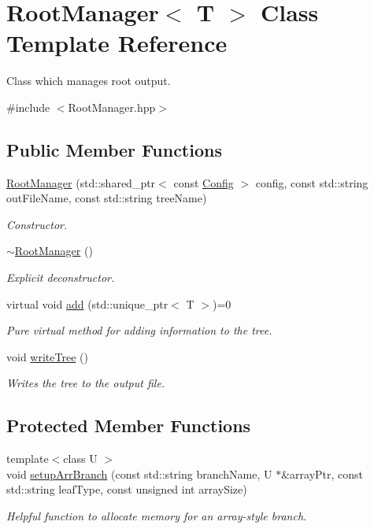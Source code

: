\hypertarget{class_root_manager}{}\section{Root\+Manager$<$ T $>$ Class Template Reference}
\label{class_root_manager}


Class which manages root output.  




{\ttfamily \#include $<$Root\+Manager.\+hpp$>$}

\subsection*{Public Member Functions}
\begin{DoxyCompactItemize}
\item 
\hyperlink{class_root_manager_a90ff78b3122c0b3fad62bc927778dda9}{Root\+Manager} (std\+::shared\+\_\+ptr$<$ const \hyperlink{class_config}{Config} $>$ config, const std\+::string out\+File\+Name, const std\+::string tree\+Name)
\begin{DoxyCompactList}\small\item\em Constructor. \end{DoxyCompactList}\item 
\hyperlink{class_root_manager_a68a189a7705b9da1da82a95ef9840d61}{$\sim$\+Root\+Manager} ()
\begin{DoxyCompactList}\small\item\em Explicit deconstructor. \end{DoxyCompactList}\item 
virtual void \hyperlink{class_root_manager_a2f05eb45d5eaee1f9f12e299395652fb}{add} (std\+::unique\+\_\+ptr$<$ T $>$)=0
\begin{DoxyCompactList}\small\item\em Pure virtual method for adding information to the tree. \end{DoxyCompactList}\item 
void \hyperlink{class_root_manager_adbe916dd56e5ec51f89c7643c4847842}{write\+Tree} ()
\begin{DoxyCompactList}\small\item\em Writes the tree to the output file. \end{DoxyCompactList}\end{DoxyCompactItemize}
\subsection*{Protected Member Functions}
\begin{DoxyCompactItemize}
\item 
{\footnotesize template$<$class U $>$ }\\void \hyperlink{class_root_manager_aa1eaed1aa026059b8d00e729161c6a43}{setup\+Arr\+Branch} (const std\+::string branch\+Name, U $\ast$\&array\+Ptr, const std\+::string leaf\+Type, const unsigned int array\+Size)
\begin{DoxyCompactList}\small\item\em Helpful function to allocate memory for an array-\/style branch. \end{DoxyCompactList}\end{DoxyCompactItemize}
